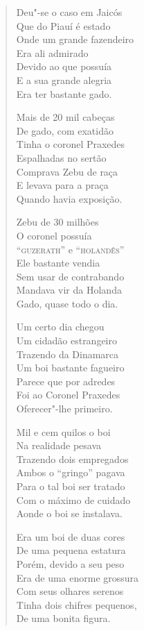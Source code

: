 \begin{verse}
Deu"-se o caso em Jaicós \\
Que do Piauí é estado \\
Onde um grande fazendeiro \\
Era ali admirado \\
Devido ao que possuía \\
E a sua grande alegria \\
Era ter bastante gado. 

Mais de 20 mil cabeças \\
De gado, com exatidão \\
Tinha o coronel Praxedes \\
Espalhadas no sertão \\
Comprava Zebu de raça \\
E levava para a praça \\
Quando havia exposição. 

Zebu de 30 milhões \\
O coronel possuía \\
``\textsc{guzerath}'' e ``\textsc{holandês}'' \\
Ele bastante vendia \\
Sem usar de contrabando \\
Mandava vir da Holanda \\
Gado, quase todo o dia. 
\pagebreak

Um certo dia chegou \\
Um cidadão estrangeiro \\
Trazendo da Dinamarca \\
Um boi bastante fagueiro \\
Parece que por adredes \\
Foi ao Coronel Praxedes \\
Oferecer"-lhe primeiro. 

Mil e cem quilos o boi \\
Na realidade pesava \\
Trazendo dois empregados \\
Ambos o ``gringo'' pagava \\
Para o tal boi ser tratado \\
Com o máximo de cuidado \\
Aonde o boi se instalava. 

Era um boi de duas cores \\
De uma pequena estatura \\
Porém, devido a seu peso \\
Era de uma enorme grossura \\
Com seus olhares serenos \\
Tinha dois chifres pequenos, \\
De uma bonita figura. 


\end{verse}
